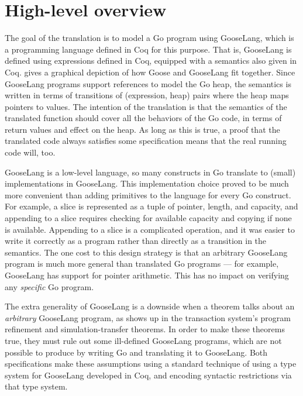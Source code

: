 \section{High-level overview}

The goal of the translation is to model a Go program using GooseLang,
which is a programming language defined in Coq for this purpose. That is,
GooseLang is defined using expressions defined in Coq, equipped with a
semantics also given in Coq.  gives a graphical
depiction of how Goose and GooseLang fit together. Since GooseLang programs support references
to model the Go heap, the semantics is written in terms of transitions
of (expression, heap) pairs where the heap maps pointers to values. The
intention of the translation is that the semantics of the translated
function should cover all the behaviors of the Go code, in terms of
return values and effect on the heap. As long as this is true, a proof
that the translated code always satisfies some specification means that
the real running code will, too.

GooseLang is a low-level language, so many constructs in Go translate to
(small) implementations in GooseLang. This implementation choice proved
to be much more convenient than adding primitives to the language for
every Go construct. For example, a slice is represented as a tuple of
pointer, length, and capacity, and appending to a slice requires
checking for available capacity and copying if none is available.
Appending to a slice is a complicated operation, and it was easier to
write it correctly as a program rather than directly as a transition in
the semantics. The one cost to this design strategy is that an arbitrary
GooseLang program is much more general than translated Go programs --- for
example, GooseLang has support for pointer arithmetic. This
has no impact on verifying any \emph{specific} Go program.

The extra generality of GooseLang is a downside when a theorem talks about an
\emph{arbitrary} GooseLang program, as shows up in the transaction system's
program refinement and simulation-transfer theorems. In order to make these
theorems true, they must rule out
some ill-defined GooseLang programs, which are
not possible to produce by writing Go and translating it to GooseLang. Both
specifications make these assumptions using a
standard technique of using a type system for GooseLang developed in Coq, and encoding
syntactic restrictions via that type system.

